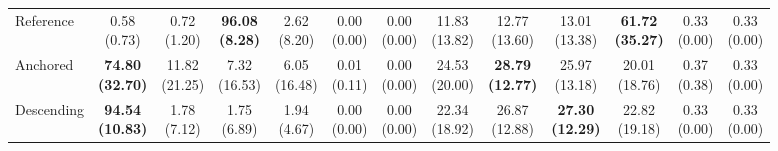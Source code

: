 {\begin{tabular}{l|cccccc|cccccc}
Reference & {\cellcolor[HTML]{C8E6C9}} \makecell{0.58 \\ (0.73)} & \makecell{0.72 \\ (1.20)} & \bfseries \makecell{96.08 \\ (8.28)} & \makecell{2.62 \\ (8.20)} & \makecell{0.00 \\ (0.00)} & \makecell{0.00 \\ (0.00)} & {\cellcolor[HTML]{C8E6C9}} \makecell{11.83 \\ (13.82)} & \makecell{12.77 \\ (13.60)} & \makecell{13.01 \\ (13.38)} & \bfseries \makecell{61.72 \\ (35.27)} & \makecell{0.33 \\ (0.00)} & \makecell{0.33 \\ (0.00)} \\
Anchored & {\cellcolor[HTML]{C8E6C9}} \bfseries \makecell{74.80 \\ (32.70)} & \makecell{11.82 \\ (21.25)} & \makecell{7.32 \\ (16.53)} & \makecell{6.05 \\ (16.48)} & \makecell{0.01 \\ (0.11)} & \makecell{0.00 \\ (0.00)} & {\cellcolor[HTML]{C8E6C9}} \makecell{24.53 \\ (20.00)} & \bfseries \makecell{28.79 \\ (12.77)} & \makecell{25.97 \\ (13.18)} & \makecell{20.01 \\ (18.76)} & \makecell{0.37 \\ (0.38)} & \makecell{0.33 \\ (0.00)} \\
Descending & {\cellcolor[HTML]{C8E6C9}} \bfseries \makecell{94.54 \\ (10.83)} & \makecell{1.78 \\ (7.12)} & \makecell{1.75 \\ (6.89)} & \makecell{1.94 \\ (4.67)} & \makecell{0.00 \\ (0.00)} & \makecell{0.00 \\ (0.00)} & {\cellcolor[HTML]{C8E6C9}} \makecell{22.34 \\ (18.92)} & \makecell{26.87 \\ (12.88)} & \bfseries \makecell{27.30 \\ (12.29)} & \makecell{22.82 \\ (19.18)} & \makecell{0.33 \\ (0.00)} & \makecell{0.33 \\ (0.00)} \\
\bottomrule
\end{tabular}
}%
